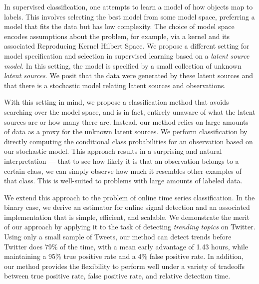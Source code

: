
In supervised classification, one attempts to learn a model of how objects map
to labels. This involves selecting the best model from some model space,
preferring a model that fits the data but has low complexity. The choice of model
space encodes assumptions about the problem, for example, via a kernel and its
associated Reproducing Kernel Hilbert Space. We propose a different setting for
model specification and selection in supervised learning based on a {\em latent
  source model}. In this setting, the model is specified by a small collection
of unknown {\em latent sources}. We posit that the data were generated by these
latent sources and that there is a stochastic model relating latent sources and
observations.

With this setting in mind, we propose a classification method that avoids
searching over the model space, and is in fact, entirely unaware of what the
latent sources are or how many there are. Instead, our method relies on large
amounts of data as a proxy for the unknown latent sources. We perform
classification by directly computing the conditional class probabilities for an
observation based on our stochastic model. This approach results in a surprising
and natural interpretation --- that to see how likely it is that an observation
belongs to a certain class, we can simply observe how much it resembles other
examples of that class. This is well-suited to problems with large amounts of
labeled data.

We extend this approach to the problem of online time series classification. In
the binary case, we derive an estimator for online signal detection and an
associated implementation that is simple, efficient, and scalable. We
demonstrate the merit of our approach by applying it to the task of detecting
{\em trending topics} on Twitter. Using only a small sample of Tweets, our
method can detect trends before Twitter does 79\% of the time, with a mean early
advantage of 1.43 hours, while maintaining a 95\% true positive rate and a 4\%
false positive rate. In addition, our method provides the flexibility to perform
well under a variety of tradeoffs between true positive rate, false positive
rate, and relative detection time.



